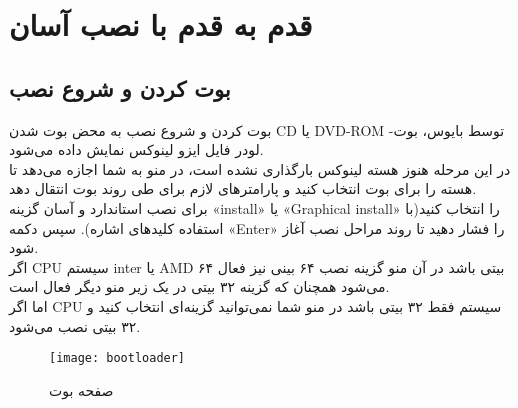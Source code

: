 
\section{قدم به قدم با نصب آسان}
\subsection{بوت کردن و شروع نصب}
\begin{frame}{بوت کردن و شروع نصب}
  به محض بوت شدن CD یا DVD-ROM توسط بایوس، بوت-لودر فایل ایزو لینوکس نمایش داده می‌شود.\\
  در این مرحله هنوز هسته لینوکس بارگذاری نشده است، در منو به شما اجازه می‌دهد تا هسته را برای بوت انتخاب کنید و پارامترهای لازم برای طی روند بوت انتقال دهد.\\
  برای نصب استاندارد و آسان گزینه «install» یا «Graphical install» را انتخاب کنید(با استفاده کلید‌های اشاره). سپس دکمه «Enter» را فشار دهید تا روند مراحل نصب آغاز شود.\\
  اگر CPU سیستم inter یا AMD ۶۴ بیتی باشد در آن منو گزینه نصب ۶۴ بینی نیز فعال می‌شود همچنان که گزینه ۳۲ بیتی در یک زیر منو دیگر فعال است.\\
  اما اگر CPU سیستم فقط ۳۲ بیتی باشد در منو شما نمی‌توانید گزینه‌ای انتخاب کنید و ۳۲ بیتی نصب می‌شود.\\
\begin{figure}
    \centering
    \texttt{[image: bootloader]}
    \caption{صفحه بوت~\cite{deb_bootscreen}}
\end{figure}
\end{frame}


